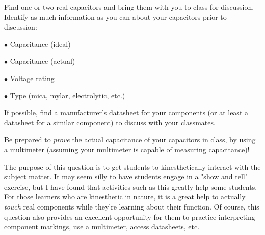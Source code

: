 

Find one or two real capacitors and bring them with you to class for discussion.  Identify as much information as you can about your capacitors prior to discussion:

\medskip
\item{$\bullet$} Capacitance (ideal)
\item{$\bullet$} Capacitance (actual)
\item{$\bullet$} Voltage rating
\item{$\bullet$} Type (mica, mylar, electrolytic, etc.)
\medskip







If possible, find a manufacturer's datasheet for your components (or at least a datasheet for a similar component) to discuss with your classmates.

Be prepared to {\it prove} the actual capacitance of your capacitors in class, by using a multimeter (assuming your multimeter is capable of measuring capacitance)!







The purpose of this question is to get students to kinesthetically interact with the subject matter.  It may seem silly to have students engage in a "show and tell" exercise, but I have found that activities such as this greatly help some students.  For those learners who are kinesthetic in nature, it is a great help to actually {\it touch} real components while they're learning about their function.  Of course, this question also provides an excellent opportunity for them to practice interpreting component markings, use a multimeter, access datasheets, etc.



